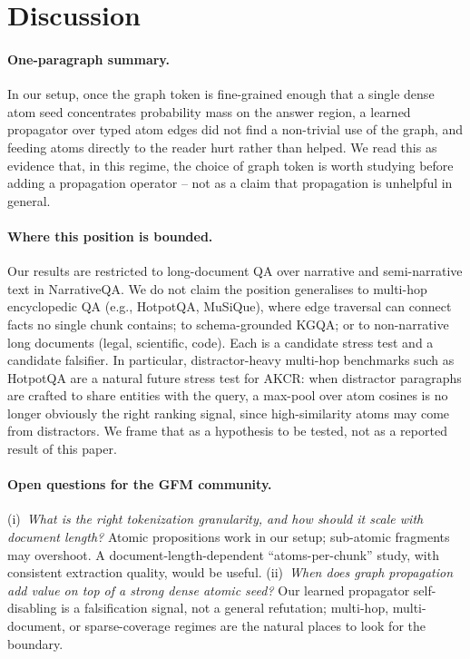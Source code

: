 \documentclass{article}
\theoremstyle{plain}
\theoremstyle{definition}
\theoremstyle{remark}
\begin{document}
\section{Discussion}
\label{sec:discussion}

\paragraph{One-paragraph summary.} In our setup, once the graph token is
fine-grained enough that a single dense atom seed concentrates probability
mass on the answer region, a learned propagator over typed atom edges did
not find a non-trivial use of the graph, and feeding atoms directly to the
reader hurt rather than helped. We read this as evidence that, in this
regime, the choice of graph token is worth studying before adding a
propagation operator -- not as a claim that propagation is unhelpful in
general.

\paragraph{Where this position is bounded.} Our results are restricted to
long-document QA over narrative and semi-narrative text in NarrativeQA. We
do not claim the position generalises to multi-hop encyclopedic QA
(e.g., HotpotQA, MuSiQue), where edge traversal can connect facts no single
chunk contains; to schema-grounded KGQA; or to non-narrative long documents
(legal, scientific, code). Each is a candidate stress test and a candidate
falsifier. In particular, distractor-heavy multi-hop benchmarks such as
HotpotQA are a natural future stress test for AKCR: when distractor
paragraphs are crafted to share entities with the query, a max-pool over
atom cosines is no longer obviously the right ranking signal, since
high-similarity atoms may come from distractors. We frame that as a
hypothesis to be tested, not as a reported result of this paper.

\paragraph{Open questions for the GFM community.}
(i)~\emph{What is the right tokenization granularity, and how should it
scale with document length?} Atomic propositions work in our setup;
sub-atomic fragments may overshoot. A document-length-dependent
``atoms-per-chunk'' study, with consistent extraction quality, would be
useful.
(ii)~\emph{When does graph propagation add value on top of a strong dense
atomic seed?} Our learned propagator self-disabling is a falsification
signal, not a general refutation; multi-hop, multi-document, or
sparse-coverage regimes are the natural places to look for the boundary.
\end{document}
